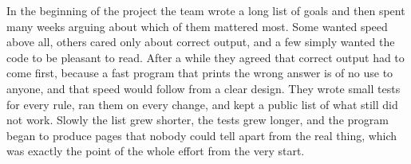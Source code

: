 \documentclass{article}
\begin{document}
In the beginning of the project the team wrote a long list of goals and then
spent many weeks arguing about which of them mattered most. Some wanted speed
above all, others cared only about correct output, and a few simply wanted the
code to be pleasant to read. After a while they agreed that correct output had
to come first, because a fast program that prints the wrong answer is of no use
to anyone, and that speed would follow from a clear design. They wrote small
tests for every rule, ran them on every change, and kept a public list of what
still did not work. Slowly the list grew shorter, the tests grew longer, and
the program began to produce pages that nobody could tell apart from the real
thing, which was exactly the point of the whole effort from the very start.
\end{document}

